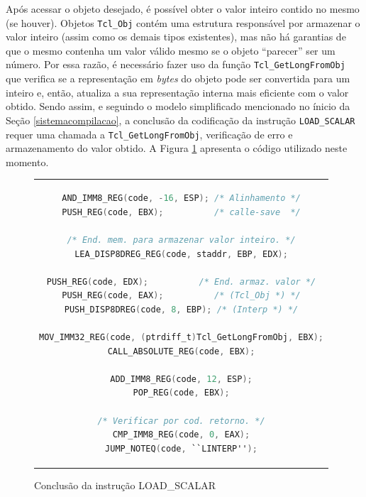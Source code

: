 Após acessar o objeto desejado, é possível obter o valor inteiro
contido no mesmo (se houver). Objetos \verb!Tcl_Obj! contém uma
estrutura responsável por armazenar o valor inteiro (assim como os
demais tipos existentes), mas não há
garantias de que o mesmo contenha um valor válido mesmo se o objeto
``parecer'' ser um número. Por essa razão, é necessário fazer uso da
função \verb!Tcl_GetLongFromObj! que verifica se a representação em
\textit{bytes} do objeto pode ser convertida para um inteiro e, então,
atualiza a sua representação interna mais eficiente com o valor
obtido. Sendo assim, e seguindo o modelo simplificado mencionado no
ínicio da Seção \ref{sistemacompilacao}, a conclusão da codificação da
instrução \verb!LOAD_SCALAR! requer uma chamada a
\verb!Tcl_GetLongFromObj!, verificação de erro e armazenamento do
valor obtido. A Figura \ref{fimloadscalar} apresenta o código
utilizado neste momento.


\begin{figure}[h]
  \centering
  \begin{tabular}{c}
    \begin{lstlisting}[language=C]
AND_IMM8_REG(code, -16, ESP); /* Alinhamento */
PUSH_REG(code, EBX);          /* calle-save  */

/* End. mem. para armazenar valor inteiro. */
LEA_DISP8DREG_REG(code, staddr, EBP, EDX);

PUSH_REG(code, EDX);          /* End. armaz. valor */
PUSH_REG(code, EAX);          /* (Tcl_Obj *) */
PUSH_DISP8DREG(code, 8, EBP); /* (Interp *) */

MOV_IMM32_REG(code, (ptrdiff_t)Tcl_GetLongFromObj, EBX);
CALL_ABSOLUTE_REG(code, EBX);

ADD_IMM8_REG(code, 12, ESP);
POP_REG(code, EBX);

/* Verificar por cod. retorno. */
CMP_IMM8_REG(code, 0, EAX);
JUMP_NOTEQ(code, ``LINTERP'');
    \end{lstlisting}
  \end{tabular}
  \caption{Conclusão da instrução LOAD\_SCALAR \label{fimloadscalar}}
\end{figure}

